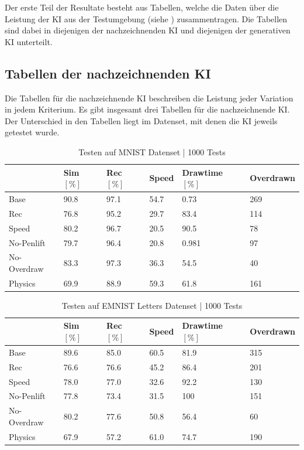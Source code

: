 Der erste Teil der Resultate besteht aus Tabellen, welche die Daten über die
Leistung der KI aus der Testumgebung (siehe )
zusammentragen. Die Tabellen sind dabei in diejenigen der nachzeichnenden KI und
diejenigen der generativen KI unterteilt.

\subsection{Tabellen der nachzeichnenden KI}\label{sub:r_tab_nachzeich}
Die Tabellen für die nachzeichnende KI beschreiben die Leistung jeder Variation
in jedem Kriterium. Es gibt insgesamt drei Tabellen für die nachzeichnende KI.
Der Unterschied in den Tabellen liegt im Datenset, mit denen die KI jeweils
getestet wurde.

\begin{table}[!ht]
    \centering
    \caption{Testen auf MNIST Datenset | 1000 Tests}\label{tab:MNIST}
    \begin{tabular}{|l|l|l|l|l|l|}
            \hline
            \hline ~ & Sim $[\%]$ & Rec $[\%]$ & Speed & Drawtime $[\%]$ & Overdrawn \\ \hline
            Base & 90.8 & 97.1 & 54.7 & 0.73 & 269 \\ \hline
            Rec & 76.8 & 95.2 & 29.7 & 83.4 & 114 \\ \hline
            Speed & 80.2 & 96.7 & 20.5 & 90.5 & 78 \\ \hline
            No-Penlift & 79.7 & 96.4 & 20.8 & 0.981 & 97 \\ \hline
            No-Overdraw & 83.3 & 97.3 & 36.3 & 54.5 & 40 \\ \hline
            Physics & 69.9 & 88.9 & 59.3 & 61.8 & 161 \\ \hline
        \end{tabular}
\end{table}

\begin{table}[!ht]
    \centering
    \caption{Testen auf EMNIST Letters Datenset | 1000 Tests}\label{tab:EMNIST}
    \begin{tabular}{|l|l|l|l|l|l|}
        \hline ~ & Sim $[\%]$ & Rec $[\%]$ & Speed & Drawtime $[\%]$ & Overdrawn \\ \hline
        Base & 89.6 & 85.0 & 60.5 & 81.9 & 315 \\ \hline
        Rec & 76.6 & 76.6 & 45.2 & 86.4 & 201 \\ \hline
        Speed & 78.0 & 77.0 & 32.6 & 92.2 & 130 \\ \hline
        No-Penlift & 77.8 & 73.4 & 31.5 & 100 & 151 \\ \hline
        No-Overdraw & 80.2 & 77.6 & 50.8 & 56.4 & 60 \\ \hline
        Physics & 67.9 & 57.2 & 61.0 & 74.7 & 190 \\ \hline
    \end{tabular}
\end{table}

